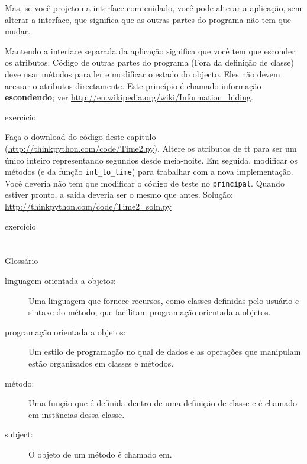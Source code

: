 \documentclass[10pt]{book}
\begin{document}
\begin{v erbatim}
Mas, se você projetou a interface com cuidado, você pode
alterar a aplicação, sem alterar a interface, que
significa que as outras partes do programa não tem que mudar.

Mantendo a interface separada da aplicação significa que
você tem que esconder os atributos. Código de outras partes do programa
(Fora da definição de classe) deve usar métodos para ler
e modificar o estado do objecto. Eles não devem acessar o
atributos directamente. Este princípio é chamado {informação \bf escondendo};
ver \url{http://en.wikipedia.org/wiki/Information_hiding}.

\begin{} exercício

Faça o download do código deste capítulo
(\url{http://thinkpython.com/code/Time2.py}). Altere os atributos
de {\Tempo tt} para ser um único inteiro representando segundos desde
meia-noite. Em seguida, modificar os métodos (e da função
\Verb "int_to_time") para trabalhar com a nova implementação. Você deveria
não tem que modificar o código de teste no {\tt principal}. Quando estiver pronto,
a saída deveria ser o mesmo que antes. Solução:
\url{http://thinkpython.com/code/Time2_soln.py}

\end{} exercício


\section{} Glossário

\begin{description}

\item[linguagem orientada a objetos:] Uma linguagem que fornece recursos,
  como classes definidas pelo usuário e sintaxe do método, que facilitam
  programação orientada a objetos.

\item[programação orientada a objetos:] Um estilo de programação no qual
de dados e as operações que manipulam estão organizados em classes
e métodos.

\item[método:] Uma função que é definida dentro de uma definição de classe e
é chamado em instâncias dessa classe.

\item[subject:] O ​​objeto de um método é chamado em.


\end{description}
\end{v erbatim}
\end{document}

